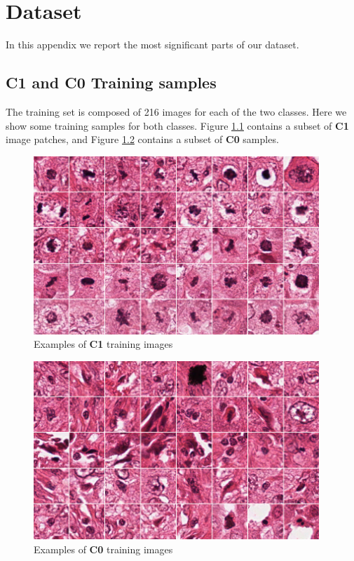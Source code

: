 \chapter{Dataset}
\label{appendixD}
\thispagestyle{empty}

\noindent In this appendix we report the most significant parts of our dataset.

\vspace{0.5cm}

\section{C1 and C0 Training samples}

\label{appendixD:samples}

The training set is composed of 216 images for each of the two classes. Here we show some training samples for both classes.
Figure \ref{appendixD:fig1} contains a subset of \textbf{C1} image patches, and Figure \ref{appendixD:fig2} contains a subset of \textbf{C0} samples.


\begin{figure}[!hb]
 \centering
  \includegraphics[width=0.96\textwidth]{./images/dataset/posTrainDataSet.png}
  \caption{Examples of \textbf{C1} training images}
  \label{appendixD:fig1}
\end{figure}

\begin{figure}[!ht]
 \centering
  \includegraphics[width=0.96\textwidth]{./images/dataset/negTrainDataSet.png}
  \caption{Examples of \textbf{C0} training images}
  \label{appendixD:fig2}
\end{figure}

